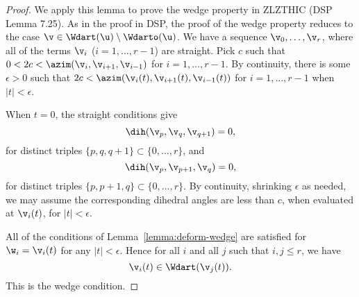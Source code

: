 \begin{proof}
We apply this lemma to prove the wedge property in ZLZTHIC (DSP Lemma 7.25).
As in the proof in DSP, the proof of the wedge property reduces to the case $\v\in \Wdart(\u)\setminus \Wdarto(\u)$.
We have a sequence $\v_0,\ldots,\v_r$, where all of the terms $\v_i$ ($i=1,\ldots,r-1$) are straight.
Pick $c$ such that  $0 < 2c < \azim(\v_i,\v_{i+1},\v_{i-1})$ for $i=1,\ldots,r-1$.
By continuity, there is some $\epsilon > 0$ such that
$2c < \azim(\v_i(t),\v_{i+1}(t),\v_{i-1}(t))$ for $i=1,\ldots,r-1$ when $|t|<\epsilon$.

When $t=0$, the straight conditions give
\[
\dih(\v_p,\v_q,\v_{q+1}) = 0,
\]
for distinct triples $\{p,q,q+1\} \subset \{0,\ldots,r\}$,
and
\[
\dih(\v_p,\v_{p+1},\v_q)=0,
\]
for distinct triples $\{p,p+1,q\}\subset \{0,\ldots,r\}$.
By continuity, shrinking $\epsilon$ as needed, we may assume the corresponding
dihedral angles are less than $c$, when evaluated at $\v_i(t)$, for $|t|<\epsilon$.

All of the conditions of Lemma~\ref{lemma:deform-wedge} are satisfied for
$\w_i = \v_i(t)$ for any $|t|<\epsilon$.  Hence for all $i$ and all $j$ such that $i,j\le r$, we have
\[
\v_i(t) \in \Wdart(\v_{j}(t)).
\]
This is the wedge condition.
\end{proof}

